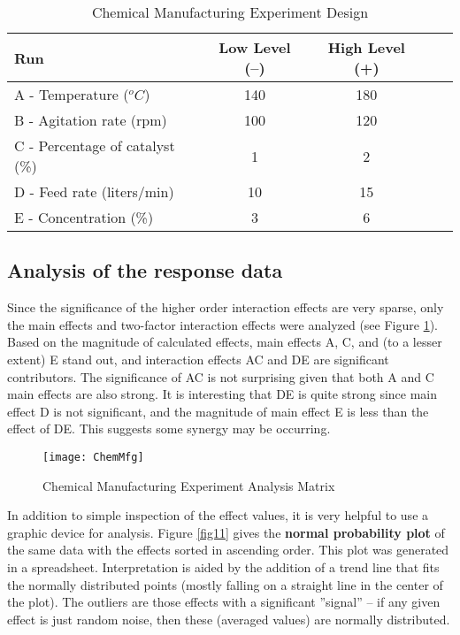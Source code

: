 \begin{table}[h]\caption{Chemical Manufacturing Experiment Design}\label{tab11}
\begin{center}
\begin{tabular}{|l|c|c|c|c|}
\hline Run & Low Level (--) & High Level (+)  \\ 
\hline A - Temperature ($^{o}C $) & 140 & 180  \\
\hline B - Agitation rate (rpm) & 100 & 120 \\
\hline C - Percentage of catalyst (\%) & 1 & 2 \\
\hline D - Feed rate (liters/min) & 10 & 15 \\
\hline E - Concentration (\%) & 3 & 6 \\
\hline
\end{tabular} 
\end{center}
\end{table}

\subsection{Analysis of the response data}
Since the significance of the higher order interaction effects are very sparse, only the main effects and two-factor interaction effects were analyzed (see Figure \ref{fig10}). Based on the magnitude of calculated effects, main effects A, C, and (to a lesser extent) E stand out, and interaction effects AC and DE are significant contributors. The significance of AC is not surprising given that both A and C main effects are also strong. It is interesting that DE is quite strong since main effect D is not significant, and the magnitude of main effect E is less than the effect of DE.  This suggests some synergy may be occurring.

\begin{figure}[h]\caption{Chemical Manufacturing Experiment Analysis Matrix}\label{fig10}
\begin{center}
\texttt{[image: ChemMfg]}
\end{center}
\end{figure}

In addition to simple inspection of the effect values, it is very helpful to use a graphic device for analysis.  Figure \ref{fig11} gives the \textbf{normal probability plot} of the same data with the effects sorted in ascending order.  This plot was generated in a spreadsheet.  Interpretation is aided by the addition of a trend line that fits the normally distributed points (mostly falling on a straight line in the center of the plot).  The outliers are those effects with a significant ''signal'' -- if any given effect is just random noise, then these (averaged values) are normally distributed.

